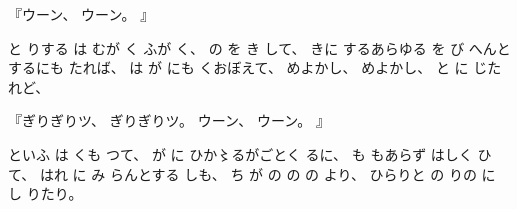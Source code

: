 %
『ウーン、
%
ウーン。
』

%
と
りする
は
むが
く
ふが
く、
%
の
を
き
して、
%
きに
するあらゆる
を
び
へんとするにも
たれば、
%
は
が
にも
くおぼえて、
%
めよかし、
%
めよかし、
%
と
に
じたれど、

%
『ぎりぎりツ、
%
ぎりぎりツ。
%
ウーン、
%
ウーン。
』

%
といふ
は
くも
つて、
%
が
に
ひか〻るがごとく
るに、
%
も
もあらず
はしく
ひて、
%
はれ
に
み
らんとする
しも、
%
ち
が
の
の
の
より、
%
ひらりと
の
りの
に
し
りたり。

